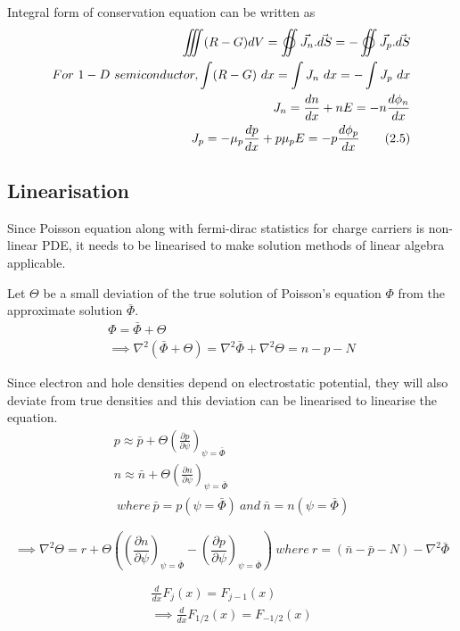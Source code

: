 Integral form of conservation equation can be written as
\begin{align*}
\iiint (R-G) dV = \varoiint \vec{J_n}.\vec{dS} = - \varoiint \vec{J_p}.\vec{dS} \\
For\ 1-D\ semiconductor,
\int (R-G)\ dx = \int J_n\ dx = - \int J_p\ dx \\
J_n = \frac{dn}{dx} + n E = -n \frac{d\phi_n}{dx}\\
J_p = -\mu_p\frac{dp}{dx} + p\mu_p E = -p \frac{d\phi_p}{dx}
\tag{2.5} \label{eq:25}
\end{align*}

\subsection{Linearisation}
Since Poisson equation along with fermi-dirac statistics for charge carriers is non-linear PDE, it needs to be linearised to make solution methods of linear algebra applicable.

Let $\Theta$ be a small deviation of the true solution of Poisson’s equation $\Phi$ from the approximate solution $\bar{\Phi}$. 
\begin{align*}
\Phi = \bar{\Phi} + \Theta \\
\implies \nabla^2 (\bar{\Phi} + \Theta) = \nabla^2 \bar{\Phi} + \nabla^2\Theta = n - p - N
\end{align*}

Since electron and hole densities depend on electrostatic potential, they will also deviate from true densities and this deviation can be linearised to linearise the equation. 
\begin{align*}
p \approx \bar{p} + \Theta\left(\frac{\partial p}{\partial \psi}\right)_{\psi = \bar{\Phi}} \\
n \approx \bar{n} + \Theta\left(\frac{\partial n}{\partial \psi}\right)_{\psi = \bar{\Phi}}  \\
\ where\ \bar{p} = p(\psi = \bar{\Phi})\ and\ \bar{n} =n(\psi = \bar{\Phi})
\end{align*}

\begin{equation}
\implies \nabla^2 \Theta = r + \Theta \left(\left(\frac{\partial n}{\partial \psi}\right)_{\psi = \bar{\Phi}} - \left(\frac{\partial p}{\partial \psi}\right)_{\psi = \bar{\Phi}}\right) \tag{2.6} \label{eq:26}
\ where\ r = (\bar{n} - \bar{p} - N) - \nabla^2 \bar{\Phi}
\end{equation}

\begin{align*}
  \frac{d}{dx}F_j(x) = F_{j-1}(x) \\
  \implies \frac{d}{dx} F_{1/2}(x) = F_{-1/2}(x) \tag{2.7} \label{eq:27}
\end{align*} 

